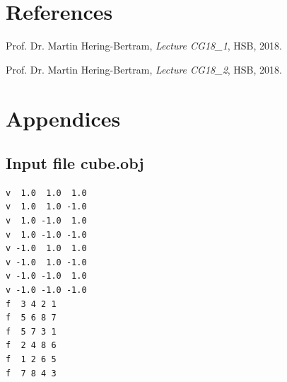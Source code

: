 \documentclass[12pt,a4paper]{scrartcl}
\begin{document}
\section{References}
\begin{thebibliography}{0} 
	Prof. Dr. Martin Hering-Bertram,
	\textit{Lecture CG18_1},
	HSB,
	2018.
	
	Prof. Dr. Martin Hering-Bertram,
	\textit{Lecture CG18_2},
	HSB,
	2018.
\end{thebibliography}

\section{Appendices}
\subsection{Input file cube.obj}
\begin{lstlisting}
v  1.0  1.0  1.0
v  1.0  1.0 -1.0
v  1.0 -1.0  1.0
v  1.0 -1.0 -1.0
v -1.0  1.0  1.0
v -1.0  1.0 -1.0
v -1.0 -1.0  1.0
v -1.0 -1.0 -1.0
f  3 4 2 1
f  5 6 8 7
f  5 7 3 1
f  2 4 8 6
f  1 2 6 5
f  7 8 4 3
\end{lstlisting}
\end{document}
